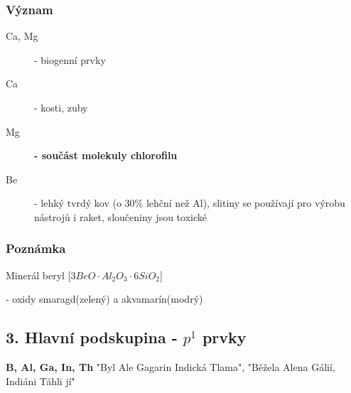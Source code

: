     \subsubsection{Význam}
    \begin{description}
        \item[Ca, Mg] - biogenní prvky
        \item[Ca] - kosti, zuby
        \item[Mg] \textbf{- součást molekuly chlorofilu}
        \item[Be] - lehký tvrdý kov (o 30\% lehční než Al), slitiny se používají pro výrobu nástrojů i raket, sloučeniny jsou toxické
    \end{description}

    \subsubsection{Poznámka}
    Minerál beryl [$3BeO \cdot Al_2O_3 \cdot 6SiO_2$]

    - oxidy smaragd(zelený) a akvamarín(modrý)

\subsection{3. Hlavní podskupina - $p^1$ prvky}
\textbf{B, Al, Ga, In, Th}
"Byl Ale Gagarin Indická Tlama", "Běžela Alena Gálií, Indiáni Táhli jí"